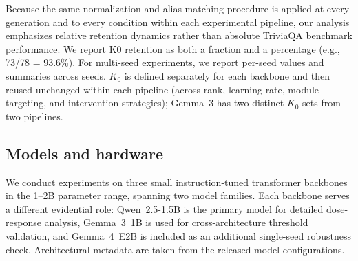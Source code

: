 \documentclass[a4paper,fleqn]{cas-dc}
\newif\ifshowchanges
\newcommand{\rev}[1]{\ifshowchanges{\color{blue}#1}\else{#1}\fi}
\begin{document}
Because the same normalization and alias-matching procedure is applied at every
generation and to \rev{every condition within each experimental pipeline}, our analysis emphasizes
relative retention dynamics rather than absolute TriviaQA benchmark performance.
We report K0 retention as both a fraction and a percentage (e.g.,
73/78 = 93.6\%). For multi-seed experiments, we report per-seed values and
summaries across seeds. $K_0$ is defined separately
for each backbone and then \rev{reused unchanged within each pipeline (across rank, learning-rate, module
targeting, and intervention strategies); Gemma~3 has two distinct $K_0$ sets from two pipelines.}

\subsection{Models and hardware}\label{sec:models}

We conduct experiments on three small instruction-tuned transformer backbones in
the 1--2B parameter range, spanning two model families. Each backbone serves a
different evidential role: Qwen~2.5-1.5B is the primary model for detailed
dose-response analysis, Gemma~3~1B is used for cross-architecture threshold
validation, and Gemma~4~E2B is included as an additional single-seed robustness
check. Architectural metadata are taken from the released model configurations.
\end{document}
